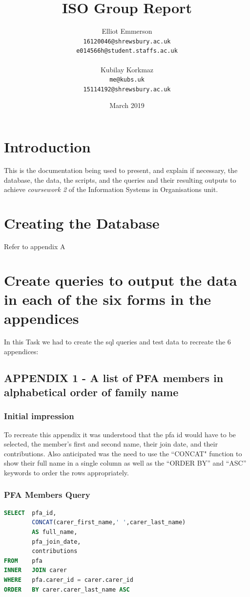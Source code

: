 \documentclass{article}
\title{ISO Group Report}
\author{
Elliot Emmerson\\
\texttt{16120046@shrewsbury.ac.uk}\\
\texttt{e014566h@student.staffs.ac.uk}
\\  \\
Kubilay Korkmaz\\
\texttt{me@kubs.uk}\\
\texttt{15114192@shrewsbury.ac.uk}
\and
}
\date{March 2019}
\begin{document}
\maketitle

\clearpage

\tableofcontents

\clearpage

\section{Introduction}This is the documentation being used to present, and explain if necessary, the database, the data, the scripts, and the queries and their resulting outputs to achieve \textit{coursework 2} of the Information Systems in Organisations unit.

\section{Creating the Database}

Refer to appendix A

\section{Create queries to output the data in each of the six forms in the appendices}In this Task we had to create the \acrshort{sql} queries and test data to recreate the 6 appendices:

\subsection{APPENDIX 1 - A list of PFA members in alphabetical order of family name}
\subsubsection{Initial impression}To recreate this appendix it was understood that the pfa id would have to be selected, the member's first and second name, their join date, and their contributions. Also anticipated was the need to use the ``CONCAT" \gls{function} to show their full name in a single column as well as the ``ORDER BY'' and ``ASC'' keywords to order the rows appropriately.


\subsubsection{PFA Members Query}
\begin{lstlisting}[language=sql, caption=PFA Members Query, style=mystyle]
SELECT  pfa_id,
        CONCAT(carer_first_name,' ',carer_last_name)
        AS full_name,
        pfa_join_date,
        contributions
FROM    pfa 
INNER   JOIN carer 
WHERE   pfa.carer_id = carer.carer_id 
ORDER   BY carer.carer_last_name ASC
\end{lstlisting}
\end{document}
